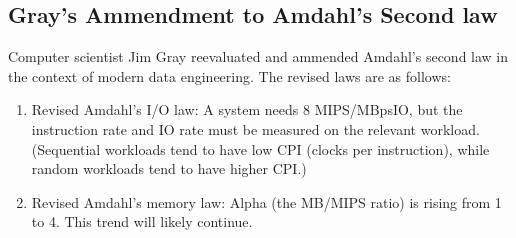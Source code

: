 \documentclass[journal]{IEEEtran}
\begin{document}
\subsection{Gray's Ammendment to Amdahl's Second law}
Computer scientist Jim Gray reevaluated and ammended Amdahl's second law in the context of modern data engineering. The revised laws are as follows:
\begin{enumerate}
\item Revised Amdahl’s I/O law: A system needs 8 MIPS/MBpsIO, but the instruction rate and IO rate must be measured on the relevant workload. (Sequential workloads tend to have low CPI (clocks per instruction), while random workloads tend to have higher CPI.)
\item Revised Amdahl’s memory law: Alpha (the MB/MIPS ratio) is rising from 1 to 4. This trend will likely continue.
\end{enumerate}
\end{document}
